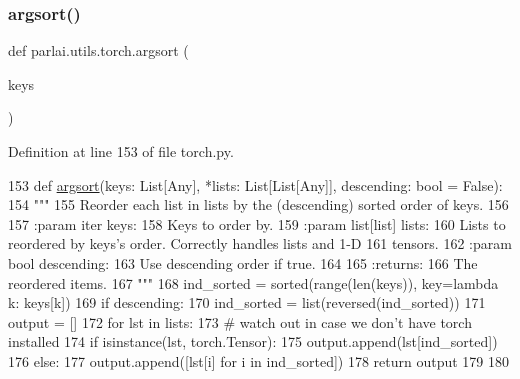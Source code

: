 \subsubsection{\texorpdfstring{argsort()}{argsort()}}
{\footnotesize\ttfamily def parlai.\+utils.\+torch.\+argsort (\begin{DoxyParamCaption}\item[{}]{keys }\end{DoxyParamCaption})}



Definition at line 153 of file torch.\+py.


\begin{DoxyCode}
153 \textcolor{keyword}{def }\hyperlink{namespaceparlai_1_1utils_1_1torch_a6c7101b91c9bc5f6e00c4c65fc5ab21c}{argsort}(keys: List[Any], *lists: List[List[Any]], descending: bool = \textcolor{keyword}{False}):
154     \textcolor{stringliteral}{"""}
155 \textcolor{stringliteral}{    Reorder each list in lists by the (descending) sorted order of keys.}
156 \textcolor{stringliteral}{}
157 \textcolor{stringliteral}{    :param iter keys:}
158 \textcolor{stringliteral}{        Keys to order by.}
159 \textcolor{stringliteral}{    :param list[list] lists:}
160 \textcolor{stringliteral}{        Lists to reordered by keys's order.  Correctly handles lists and 1-D}
161 \textcolor{stringliteral}{        tensors.}
162 \textcolor{stringliteral}{    :param bool descending:}
163 \textcolor{stringliteral}{        Use descending order if true.}
164 \textcolor{stringliteral}{}
165 \textcolor{stringliteral}{    :returns:}
166 \textcolor{stringliteral}{        The reordered items.}
167 \textcolor{stringliteral}{    """}
168     ind\_sorted = sorted(range(len(keys)), key=\textcolor{keyword}{lambda} k: keys[k])
169     \textcolor{keywordflow}{if} descending:
170         ind\_sorted = list(reversed(ind\_sorted))
171     output = []
172     \textcolor{keywordflow}{for} lst \textcolor{keywordflow}{in} lists:
173         \textcolor{comment}{# watch out in case we don't have torch installed}
174         \textcolor{keywordflow}{if} isinstance(lst, torch.Tensor):
175             output.append(lst[ind\_sorted])
176         \textcolor{keywordflow}{else}:
177             output.append([lst[i] \textcolor{keywordflow}{for} i \textcolor{keywordflow}{in} ind\_sorted])
178     \textcolor{keywordflow}{return} output
179 
180 
\end{DoxyCode}
\mbox{\label{namespaceparlai_1_1utils_1_1torch_acd34433af9f43b196920120e6009494e}} 

